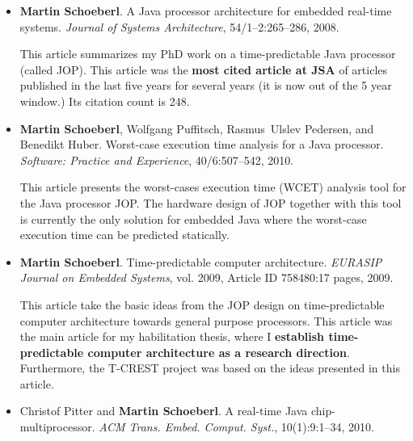 \documentclass[%
    a4paper,
    11pt, %
    headinclude, footexclude,
    notitlepage,
    headsepline,
    pointlessnumbers,
    ]{scrartcl}
\begin{document}
\begin{itemize}

\item {\bf Martin Schoeberl}. A Java processor architecture for
embedded real-time systems. {\em Journal of Systems
Architecture}, 54/1--2:265--286, 2008.

This article summarizes my PhD work on a time-predictable Java processor
(called JOP). This article was the \textbf{most cited article at JSA} of articles
published in the last five years for several years (it is now out of the 5 year
window.) Its citation count is 248.

\item {\bf Martin Schoeberl}, Wolfgang Puffitsch, Rasmus~Ulslev
    Pedersen, and Benedikt Huber. Worst-case execution time
  analysis for a {Java} processor. {\em Software: Practice and
  Experience}, 40/6:507--542, 2010.
  
This article presents the worst-cases execution time (WCET) analysis tool for
the Java processor JOP.
The hardware design of JOP together with this tool is currently the only
solution for embedded Java where the worst-case execution time can
be predicted statically.

\item {\bf Martin Schoeberl}. Time-predictable computer architecture.
    {\em EURASIP Journal on Embedded Systems}, vol. 2009, Article
    ID 758480:17 pages, 2009.
    
This article take the basic ideas from the JOP design on time-predictable
computer architecture towards general purpose processors. This article was
the main article for my habilitation thesis, where I {\bf establish time-predictable
computer architecture as a research direction}.
Furthermore, the T-CREST project was based on the ideas presented in this article.
   
%

\item Christof Pitter and {\bf Martin Schoeberl}.
A real-time {Java} chip-multiprocessor.
{\em ACM Trans. Embed. Comput. Syst.}, 10(1):9:1--34, 2010.


\end{itemize}
\end{document}
